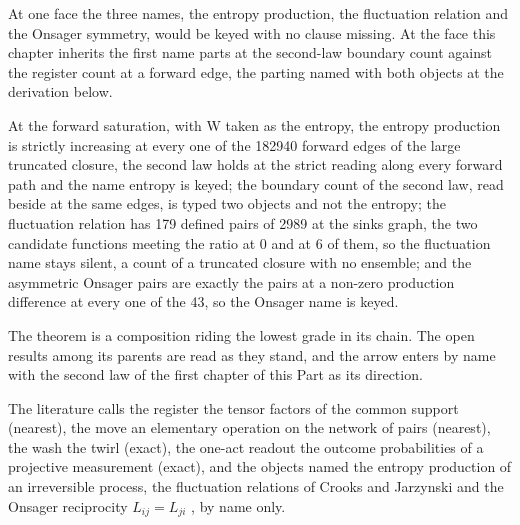 At one face the three names, the entropy production, the fluctuation relation and the Onsager symmetry, would be keyed with no clause missing. At the face this chapter inherits the first name parts at the second-law boundary count against the register count at a forward edge, the parting named with both objects at the derivation below.
\begin{chtheorem}\label{box:XI-7-thermodynamic-remainder-and-the-arrow:2}
At the forward saturation, with W taken as the entropy, the entropy production is strictly increasing at every one of the 182940 forward edges of the large truncated closure, the second law holds at the strict reading along every forward path and the name entropy is keyed; the boundary count of the second law, read beside at the same edges, is typed two objects and not the entropy; the fluctuation relation has 179 defined pairs of 2989 at the sinks graph, the two candidate functions meeting the ratio at 0 and at 6 of them, so the fluctuation name stays silent, a count of a truncated closure with no ensemble; and the asymmetric Onsager pairs are exactly the pairs at a non-zero production difference at every one of the 43, so the Onsager name is keyed.
\end{chtheorem}
The theorem is a composition riding the lowest grade in its chain. The open results among its parents are read as they stand, and the arrow enters by name with the second law of the first chapter of this Part as its direction.
\begin{chbridge}
The literature calls the register the tensor factors of the common support (nearest), the move an elementary operation on the network of pairs (nearest), the wash the twirl (exact), the one-act readout the outcome probabilities of a projective measurement (exact), and the objects named the entropy production of an irreversible process, the fluctuation relations of Crooks and Jarzynski \cite{Jarzynski1997,Crooks1999} and the Onsager reciprocity $L_{ij} = L_{ji}$ \cite{Onsager1931}, by name only.
\end{chbridge}
